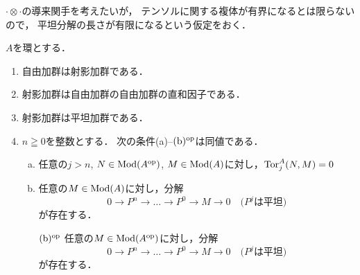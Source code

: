 \(\cdot\otimes\cdot\)の導来関手を考えたいが，
テンソルに関する複体が有界になるとは限らないので，
平坦分解の長さが有限になるという仮定をおく．

\begin{PRP}
    \(A\)を環とする．
    \begin{enumerate}
        \item 自由加群は射影加群である．
        
        \item 射影加群は自由加群の自由加群の直和因子である．
        
        \item 射影加群は平坦加群である．
        
        \item \(n\geqq0\)を整数とする．
            次の条件(a)--\((\text{b})^{{\rm op}}\)は同値である．
            \begin{enumerate}[(a)]
                \item 任意の\(j>n\), \(N\in\mathop{\mathrm{Mod}}\nolimits(A^{\rm op})\), 
                \(M\in\mathop{\mathrm{Mod}}\nolimits(A)\)に対し，\(\mathop{\mathrm{Tor}}\nolimits_j^A(N,M)=0\)
                \item 任意の\(M\in\mathop{\mathrm{Mod}}\nolimits(A)\)に対し，分解\[
                    0\to P^n\to\dots\to P^0\to M\to0\quad\text{(\(P^j\)は平坦)}
                    \]が存在する．
                \item[\((\text{b})^{{\rm op}}\)]\setlength{\leftskip}{10pt}
                任意の\(M\in\mathop{\mathrm{Mod}}\nolimits(A^{\rm op})\)に対し，分解\[
                    0\to P^n\to\dots\to P^0\to M\to0\quad\text{(\(P^j\)は平坦)}
                \]が存在する．
            \end{enumerate}
    \end{enumerate}
\end{PRP}
